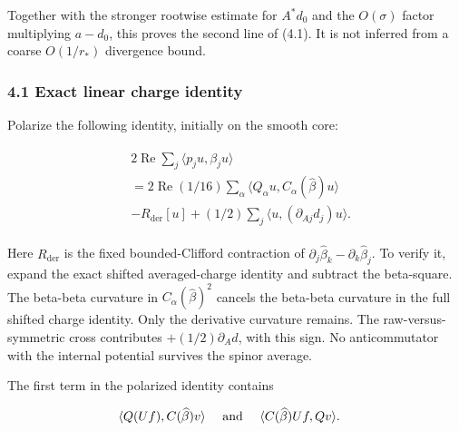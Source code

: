 Together with the stronger rootwise estimate for \(A^{*}d_{0}\) and the
\(O(\sigma )\) factor multiplying \(a-d_{0}\), this proves the second
line of (4.1). It is not inferred from a coarse \(O(1/r_{*})\)
divergence bound.

\subsubsection{4.1 Exact linear charge
identity}\label{i-exact-linear-charge-identity}

Polarize the following identity, initially on the smooth core:

\begin{gather*}
\begin{aligned}
& 2 \operatorname{Re}  \sum _{j} \langle p_{j} u,\beta _{j} u\rangle \\
& =2 \operatorname{Re}  (1/16)\sum _{\alpha} \langle Q_{\alpha} u,C_{\alpha}(\widehat{\beta})u\rangle \\
& -R_{\mathrm{der}}[u]+(1/2)\sum _{j} \langle u,(\partial _{Aj} d_{j})u\rangle .
\end{aligned}\tag{4.3}
\end{gather*}

Here \(R_{\mathrm{der}}\) is the fixed bounded-Clifford contraction of
\(\partial _{j} \widehat{\beta}_{k}-\partial _{k} \widehat{\beta}_{j}\).
To verify it, expand the exact shifted averaged-charge identity and
subtract the beta-square. The beta-beta curvature in
\(C_{\alpha}(\widehat{\beta})^{2}\) cancels the beta-beta curvature in
the full shifted charge identity. Only the derivative curvature remains.
The raw-versus-symmetric cross contributes \(+(1/2)\partial _{A} d\),
with this sign. No anticommutator with the internal potential survives
the spinor average.

The first term in the polarized identity contains

\begin{gather*}
\begin{aligned}
& \langle Q(Uf),C(\widehat{\beta})v\rangle  \quad  \text{ and } \quad  \langle C(\widehat{\beta})Uf,Qv\rangle .
\end{aligned}\notag
\end{gather*}

